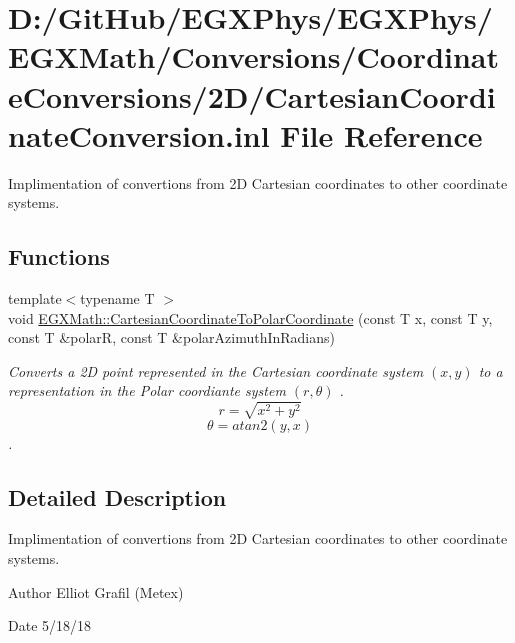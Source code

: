 \hypertarget{_cartesian_coordinate_conversion_8inl}{}\section{D\+:/\+Git\+Hub/\+E\+G\+X\+Phys/\+E\+G\+X\+Phys/\+E\+G\+X\+Math/\+Conversions/\+Coordinate\+Conversions/2\+D/\+Cartesian\+Coordinate\+Conversion.inl File Reference}
\label{_cartesian_coordinate_conversion_8inl}


Implimentation of convertions from 2D Cartesian coordinates to other coordinate systems.  


\subsection*{Functions}
\begin{DoxyCompactItemize}
\item 
{\footnotesize template$<$typename T $>$ }\\void \mbox{\hyperlink{group___e_g_x_math-_conversions-_coordinate_conversions-2_d-_cartesian_ga01ead70b7b75d7ad0f80776c8c254897}{E\+G\+X\+Math\+::\+Cartesian\+Coordinate\+To\+Polar\+Coordinate}} (const T x, const T y, const T \&polarR, const T \&polar\+Azimuth\+In\+Radians)
\begin{DoxyCompactList}\small\item\em Converts a 2D point represented in the Cartesian coordinate system $(x,y)$ to a representation in the Polar coordiante system $(r,\theta)$ . \[ r = \sqrt{x^2+y^2} \] \[ \theta = atan2(y,x) \]. \end{DoxyCompactList}\end{DoxyCompactItemize}


\subsection{Detailed Description}
Implimentation of convertions from 2D Cartesian coordinates to other coordinate systems. 

\begin{DoxyAuthor}{Author}
Elliot Grafil (Metex) 
\end{DoxyAuthor}
\begin{DoxyDate}{Date}
5/18/18 
\end{DoxyDate}
